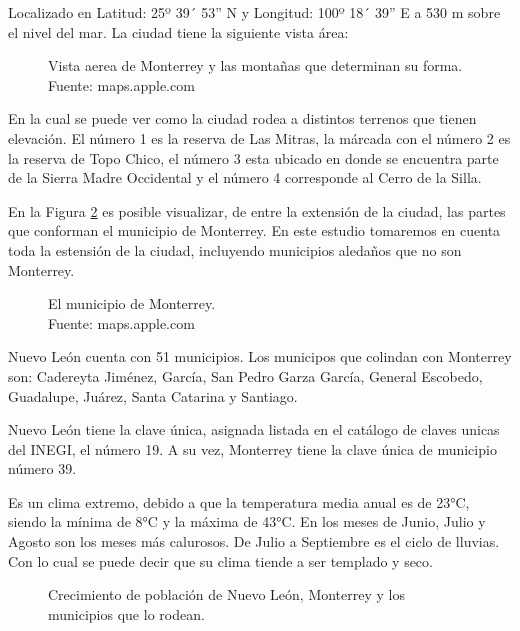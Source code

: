\documentclass[a4paper]{article}
\begin{document}
Localizado en Latitud: 25º 39´ 53” N y  Longitud: 100º 18´ 39” E a 530 m sobre el nivel del mar. La ciudad tiene la siguiente vista área:


\begin{figure}[H]
    \centering

    \caption{Vista aerea de Monterrey y las montañas que determinan su forma. \\Fuente: maps.apple.com}
    \label{fig:my_label}
\end{figure}

En la cual se puede ver como la ciudad rodea a distintos terrenos que tienen elevación. El número 1 es la reserva de Las Mitras, la márcada con el número 2 es la reserva de Topo Chico, el número 3 esta ubicado en donde se encuentra parte de la Sierra Madre Occidental y el número 4 corresponde al Cerro de la Silla.

En la Figura \ref{fig:aerea2} es posible visualizar, de entre la extensión de la ciudad, las partes que conforman el municipio de Monterrey. En este estudio tomaremos en cuenta toda la estensión de la ciudad, incluyendo municipios aledaños que no son Monterrey.

\begin{figure}[H]
    \centering

    \caption{El municipio de Monterrey. \\Fuente: maps.apple.com}
    \label{fig:aerea2}
\end{figure}

Nuevo León cuenta con 51 municipios. Los municipos que colindan con Monterrey son: Cadereyta Jiménez, García, San Pedro Garza García, General Escobedo, Guadalupe, Juárez, Santa Catarina y Santiago.

\autocite{RN1}


Nuevo León tiene la clave única, asignada listada en el catálogo de claves unicas del INEGI, el número 19. A su vez, Monterrey tiene la clave única de municipio número 39.  

Es un clima extremo, debido a que la temperatura media anual es de 23°C, siendo la mínima de 8°C y la máxima de 43°C. En los meses de Junio, Julio y Agosto son los meses más calurosos. De Julio a Septiembre es el ciclo de lluvias. Con lo cual se puede decir que su clima tiende a ser templado y seco.

\begin{figure}[H]
    \centering

    \caption{Crecimiento de población de Nuevo León, Monterrey y los municipios que lo rodean.\autocite{Poblacion}}
    \label{fig:Pob2}
\end{figure}
\end{document}
